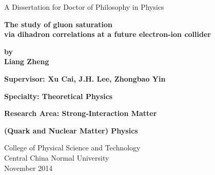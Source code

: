 \mbox{}\vskip 0.8cm
\begin{center}
{\Large A Dissertation for Doctor of Philosophy in Physics}
\end{center}
\vspace{0.22in}
\begin{center} {\LARGE \textbf{The study of gluon saturation \\ via dihadron correlations at a future electron-ion collider}}
\end{center}
\vspace{0.22in}

\begin{center}
\bfseries{
{\Large  by \\ Liang Zheng  
\vskip 0.22in  \vskip 0.4in }
}
\end{center}


\mbox{}\hskip 0.3cm{\Large { \bfseries Supervisor:  Xu Cai, J.H. Lee, Zhongbao Yin
} }

\mbox{}\hskip 0.3cm{\Large { \bfseries Specialty:  Theoretical Physics} }

\mbox{}\hskip 0.3cm{\Large { \bfseries Research Area: Strong-Interaction Matter } }

\mbox{}\hskip 0.3cm{\Large { \bfseries (Quark and Nuclear Matter) Physics} }

\vskip 1.55in


\begin{center}
{\Large
College of Physical Science and Technology \\
Central \hskip 0.2cm China \hskip 0.2cm Normal \hskip 0.2cm University \\ 
\vskip 0.22cm November \hskip 0.2cm 2014 }
\end{center}

\clearpage
